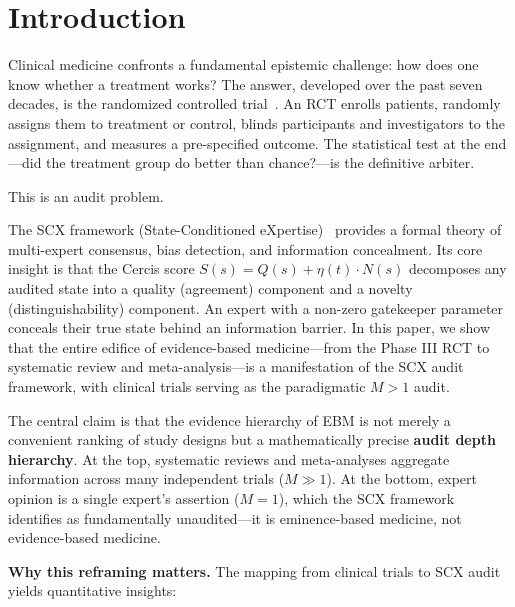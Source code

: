 \documentclass[12pt,a4paper]{article}
\theoremstyle{remark}
\newcommand{\SCX}{\textsf{SCX}}
\newcommand{\Cercis}{\textsf{Cercis}}
\begin{document}
\section{Introduction}
\label{sec:intro}

Clinical medicine confronts a fundamental epistemic challenge: how does one
know whether a treatment works? The answer, developed over the past seven
decades, is the randomized controlled trial~\cite{hill1965environment,
fisher1935design}. An RCT enrolls patients, randomly assigns them to
treatment or control, blinds participants and investigators to the
assignment, and measures a pre-specified outcome. The statistical test at
the end---did the treatment group do better than chance?---is the definitive
arbiter.

This is an audit problem.

The \SCX{} framework (State-Conditioned eXpertise)~\cite{scx_theory}
provides a formal theory of multi-expert consensus, bias detection, and
information concealment. Its core insight is that the \Cercis{} score
$S(s) = Q(s) + \eta(t) \cdot N(s)$ decomposes any audited state into a
quality (agreement) component and a novelty (distinguishability) component.
An expert with a non-zero gatekeeper parameter conceals their true state
behind an information barrier. In this paper, we show that the entire
edifice of evidence-based medicine---from the Phase III RCT to systematic
review and meta-analysis---is a manifestation of the \SCX{} audit framework,
with clinical trials serving as the paradigmatic $M > 1$ audit.

The central claim is that the evidence hierarchy of EBM is not merely a
convenient ranking of study designs but a mathematically precise
\textbf{audit depth hierarchy}. At the top, systematic reviews and
meta-analyses aggregate information across many independent trials
($M \gg 1$). At the bottom, expert opinion is a single expert's assertion
($M = 1$), which the \SCX{} framework identifies as fundamentally
unaudited---it is eminence-based medicine, not evidence-based medicine.

\medskip
\noindent\textbf{Why this reframing matters.} The mapping from clinical
trials to \SCX{} audit yields quantitative insights:
\end{document}

